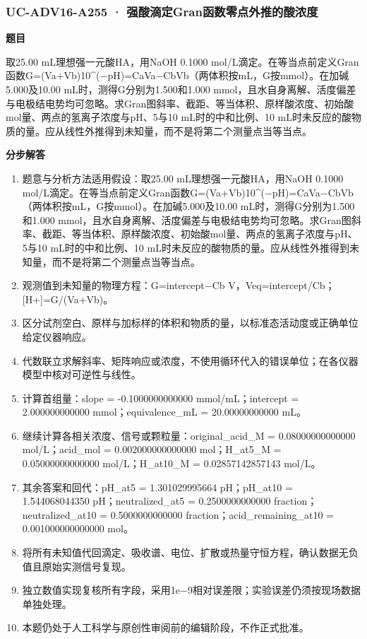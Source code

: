 \documentclass[UTF8,11pt,a4paper]{ctexart}
\begin{document}
\subsubsection*{UC-ADV16-A255 · 强酸滴定Gran函数零点外推的酸浓度}
\noindent\textbf{题目}\par
取25.00 mL理想强一元酸HA，用NaOH 0.1000 mol/L滴定。在等当点前定义Gran函数G=(Va+Vb)10\textasciicircum{}(−pH)=CaVa−CbVb（两体积按mL，G按mmol）。在加碱5.000及10.00 mL时，测得G分别为1.500和1.000 mmol，且水自身离解、活度偏差与电极结电势均可忽略。求Gran图斜率、截距、等当体积、原样酸浓度、初始酸mol量、两点的氢离子浓度与pH、5与10 mL时的中和比例、10 mL时未反应的酸物质的量。应从线性外推得到未知量，而不是将第二个测量点当等当点。\par
\medskip\noindent\textbf{分步解答}
\begin{enumerate}
\item 题意与分析方法适用假设：取25.00 mL理想强一元酸HA，用NaOH 0.1000 mol/L滴定。在等当点前定义Gran函数G=(Va+Vb)10\textasciicircum{}(−pH)=CaVa−CbVb（两体积按mL，G按mmol）。在加碱5.000及10.00 mL时，测得G分别为1.500和1.000 mmol，且水自身离解、活度偏差与电极结电势均可忽略。求Gran图斜率、截距、等当体积、原样酸浓度、初始酸mol量、两点的氢离子浓度与pH、5与10 mL时的中和比例、10 mL时未反应的酸物质的量。应从线性外推得到未知量，而不是将第二个测量点当等当点。
\item 观测值到未知量的物理方程：G=intercept−Cb V，Veq=intercept/Cb；[H+]=G/(Va+Vb)。
\item 区分试剂空白、原样与加标样的体积和物质的量，以标准态活动度或正确单位给定仪器响应。
\item 代数联立求解斜率、矩阵响应或浓度，不使用循环代入的错误单位；在各仪器模型中核对可逆性与线性。
\item 计算首组量：slope = -0.1000000000000 mmol/mL；intercept = 2.000000000000 mmol；equivalence\_mL = 20.00000000000 mL。
\item 继续计算各相关浓度、信号或颗粒量：original\_acid\_M = 0.08000000000000 mol/L；acid\_mol = 0.002000000000000 mol；H\_at5\_M = 0.05000000000000 mol/L；H\_at10\_M = 0.02857142857143 mol/L。
\item 其余答案和回代：pH\_at5 = 1.301029995664 pH；pH\_at10 = 1.544068044350 pH；neutralized\_at5 = 0.2500000000000 fraction；neutralized\_at10 = 0.5000000000000 fraction；acid\_remaining\_at10 = 0.001000000000000 mol。
\item 将所有未知值代回滴定、吸收谱、电位、扩散或热量守恒方程，确认数据无负值且原始实测信号复现。
\item 独立数值实现复核所有字段，采用1e−9相对误差限；实验误差仍须按现场数据单独处理。
\item 本题仍处于人工科学与原创性审阅前的编辑阶段，不作正式批准。
\end{enumerate}
\end{document}
